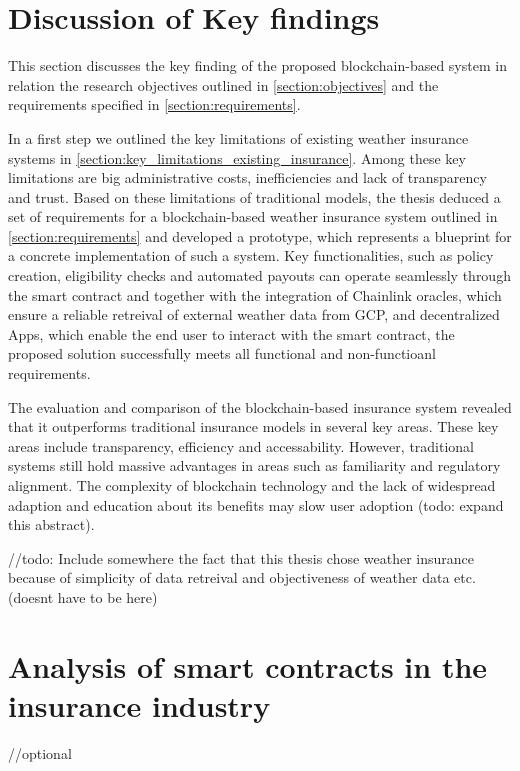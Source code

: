 \section{Discussion of Key findings}
This section discusses the key finding of the proposed blockchain-based system in relation the research objectives outlined in \cref{section:objectives} and the requirements specified in \cref{section:requirements}. 

In a first step we outlined the key limitations of existing weather insurance systems in \cref{section:key_limitations_existing_insurance}. Among these key limitations are big administrative costs, inefficiencies and lack of transparency and trust. Based on these limitations of traditional models, the thesis deduced a set of requirements for a blockchain-based weather insurance system outlined in \cref{section:requirements} and developed a prototype, which represents a blueprint for a concrete implementation of such a system. Key functionalities, such as policy creation, eligibility checks and automated payouts can operate seamlessly through the smart contract and together with the integration of Chainlink oracles, which ensure a reliable retreival of external weather data from GCP, and decentralized Apps, which enable the end user to interact with the smart contract, the proposed solution successfully meets all functional and non-functioanl requirements.

The evaluation and comparison of the blockchain-based insurance system revealed that it outperforms traditional insurance models in several key areas. These key areas include transparency, efficiency and accessability. However, traditional systems still hold massive advantages in areas such as familiarity and regulatory alignment. The complexity of blockchain technology and the lack of widespread adaption and education about its benefits may slow user adoption (todo: expand this abstract).

//todo: Include somewhere the fact that this thesis chose weather insurance because of simplicity of data retreival and objectiveness of weather data etc. (doesnt have to be here)

\section{Analysis of smart contracts in the insurance industry}\label{section:analysis_smart_contracts_insurance}
//optional

